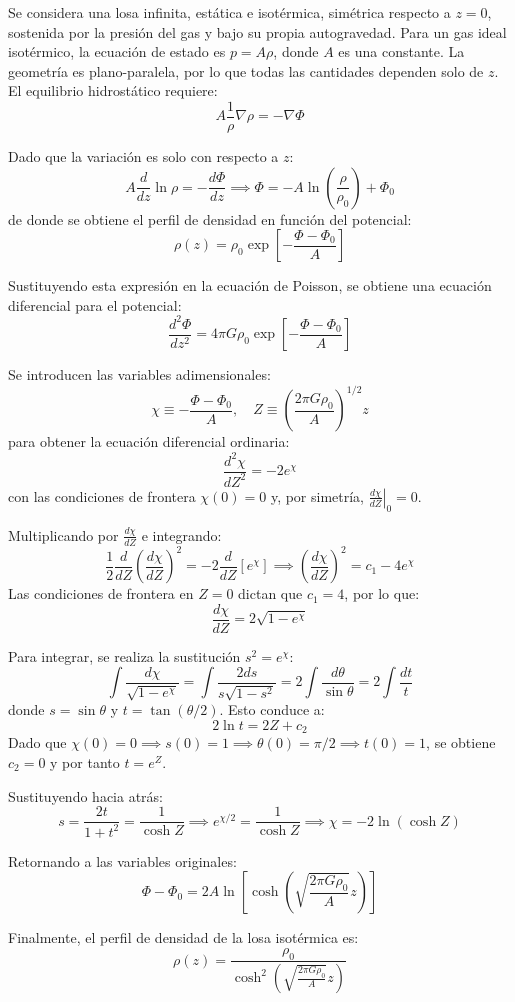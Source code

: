 Se considera una losa infinita, estática e isotérmica, simétrica respecto a $z=0$, sostenida por la presión del gas y bajo su propia autogravedad. Para un gas ideal isotérmico, la ecuación de estado es $p = A\rho$, donde $A$ es una constante. La geometría es plano-paralela, por lo que todas las cantidades dependen solo de $z$. El equilibrio hidrostático requiere:
$$ A \frac{1}{\rho} \nabla \rho = -\nabla \Phi $$

Dado que la variación es solo con respecto a $z$:
$$ A \frac{d}{dz} \ln \rho = -\frac{d\Phi}{dz} \implies \Phi = -A \ln\left(\frac{\rho}{\rho_0}\right) + \Phi_0 $$
de donde se obtiene el perfil de densidad en función del potencial:
$$ \rho(z) = \rho_0 \exp\left[-\frac{\Phi - \Phi_0}{A}\right] $$

Sustituyendo esta expresión en la ecuación de Poisson, se obtiene una ecuación diferencial para el potencial:
$$ \frac{d^2\Phi}{dz^2} = 4\pi G \rho_0 \exp\left[-\frac{\Phi - \Phi_0}{A}\right] $$

Se introducen las variables adimensionales:
$$ \chi \equiv -\frac{\Phi - \Phi_0}{A}, \quad Z \equiv \left(\frac{2\pi G \rho_0}{A}\right)^{1/2} z $$
para obtener la ecuación diferencial ordinaria:
$$ \frac{d^2\chi}{dZ^2} = -2e^\chi $$
con las condiciones de frontera $\chi(0) = 0$ y, por simetría, $\left.\frac{d\chi}{dZ}\right|_0 = 0$.

Multiplicando por $\frac{d\chi}{dZ}$ e integrando:
$$ \frac{1}{2} \frac{d}{dZ} \left(\frac{d\chi}{dZ}\right)^2 = -2 \frac{d}{dZ} [e^\chi] \implies \left(\frac{d\chi}{dZ}\right)^2 = c_1 - 4e^\chi $$
Las condiciones de frontera en $Z=0$ dictan que $c_1 = 4$, por lo que:
$$ \frac{d\chi}{dZ} = 2\sqrt{1 - e^\chi} $$

Para integrar, se realiza la sustitución $s^2 = e^\chi$:
$$ \int \frac{d\chi}{\sqrt{1 - e^\chi}} = \int \frac{2 ds}{s\sqrt{1 - s^2}} = 2\int \frac{d\theta}{\sin \theta} = 2\int \frac{dt}{t} $$
donde $s = \sin \theta$ y $t = \tan(\theta/2)$. Esto conduce a:
$$ 2 \ln t = 2Z + c_2 $$
Dado que $\chi(0) = 0 \implies s(0) = 1 \implies \theta(0) = \pi/2 \implies t(0) = 1$, se obtiene $c_2 = 0$ y por tanto $t = e^Z$.

Sustituyendo hacia atrás:
$$ s = \frac{2t}{1 + t^2} = \frac{1}{\cosh Z} \implies e^{\chi/2} = \frac{1}{\cosh Z} \implies \chi = -2 \ln(\cosh Z) $$

Retornando a las variables originales:
$$ \Phi - \Phi_0 = 2A \ln\left[\cosh\left(\sqrt{\frac{2\pi G \rho_0}{A}} z\right)\right] $$

Finalmente, el perfil de densidad de la losa isotérmica es:
$$ \rho(z) = \frac{\rho_0}{\cosh^2\left(\sqrt{\frac{2\pi G \rho_0}{A}} z\right)} $$

